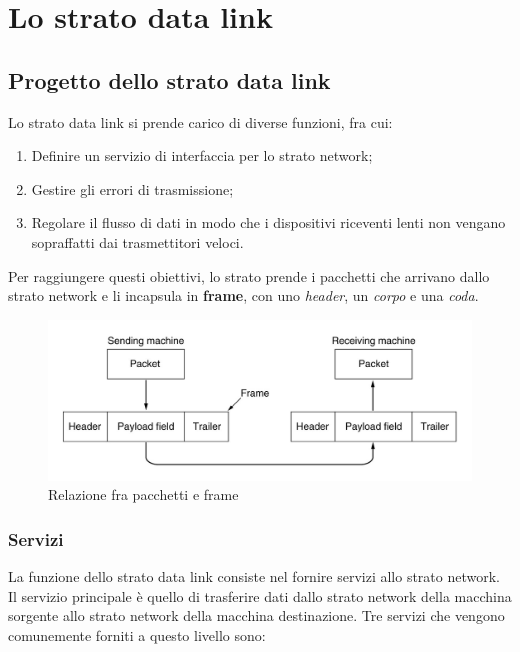 \section{Lo strato data link}

\subsection{Progetto dello strato data link}
Lo strato data link si prende carico di diverse funzioni, fra cui:

\begin{enumerate}

\item{Definire un servizio di interfaccia per lo strato network};
\item{Gestire gli errori di trasmissione};
\item{Regolare il flusso di dati in modo che i dispositivi riceventi lenti non vengano sopraffatti dai trasmettitori veloci}.

\end{enumerate}

Per raggiungere questi obiettivi, lo strato prende i pacchetti che arrivano dallo strato network e li incapsula in \textbf{frame}, con uno \textit{header}, un \textit{corpo} e una \textit{coda}.

\begin{figure}[htbp]
\centering
\includegraphics[scale=1]{images/package_frame.jpg}
\caption{Relazione fra pacchetti e frame}
\end{figure}

\subsubsection{Servizi}

La funzione dello strato data link consiste nel fornire servizi allo strato network. Il servizio principale è quello di trasferire dati dallo strato network della macchina sorgente allo strato network della macchina destinazione. Tre servizi che vengono comunemente forniti a questo livello sono:


